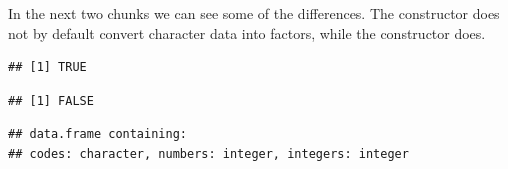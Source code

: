 \documentclass[krantz2]{krantz}\usepackage{knitr}
\begin{document}
\begin{knitrout}\footnotesize
{}\color{fgcolor}\begin{kframe}
\begin{alltt}
 \hlkwb{<-} \hlstd{(}\hlstd{) \{}
  \hlstd{(}
    \hlstd{(}\hlstd{(}\hlstd{(x)[}\hlstd{],}
    \hlstd{),}
    \hlstd{(}
            \hlstd{=} \hlstd{,}  \hlstd{=} \hlstd{),}
     \hlstd{=} \hlstd{)}
    \hlstd{)}
\hlstd{\}}
\end{alltt}
\end{kframe}
\end{knitrout}

In the next two chunks we can see some of the differences. The  constructor does not by default convert character data into factors, while the  constructor does.

\begin{knitrout}\footnotesize
{}\color{fgcolor}\begin{kframe}
\begin{alltt}
 \hlkwb{<-} \hlstd{(} \hlstd{=} \hlstd{(}\hlstd{,} \hlstd{,} \hlstd{),}  \hlstd{=} \hlopt{:}\hlstd{,}  \hlstd{=} \hlopt{:}\hlstd{)}
\end{alltt}
\begin{verbatim}
## [1] TRUE
\end{verbatim}
\begin{alltt}
\end{alltt}
\begin{verbatim}
## [1] FALSE
\end{verbatim}
\begin{alltt}
\end{alltt}
\begin{verbatim}
## data.frame containing:
## codes: character, numbers: integer, integers: integer
\end{verbatim}
\end{kframe}
\end{knitrout}
\end{document}
